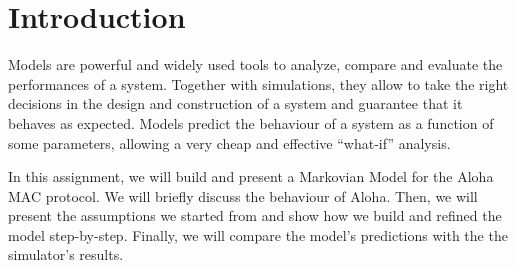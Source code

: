 \section{Introduction}
\label{sec:introduction}

Models are powerful and widely used tools to analyze, compare and evaluate the performances of a system.
Together with simulations, they allow to take the right decisions in the design and construction of a system and guarantee that it behaves as expected.
Models predict the behaviour of a system as a function of some parameters, allowing a very cheap and effective ``what-if'' analysis.

In this assignment, we will build and present a Markovian Model for the Aloha \ac{MAC} protocol.
We will briefly discuss the behaviour of Aloha. Then, we will present the assumptions we started from and show how we build and refined the model step-by-step.
Finally, we will compare the model's predictions with the the simulator's results.
